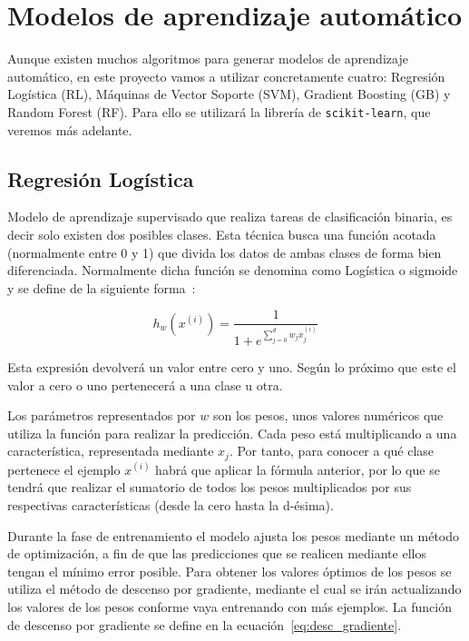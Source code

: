 \documentclass[a4paper, 12pt]{book}
\begin{document}
\section{Modelos de aprendizaje automático}
\label{sec:modelos_aautomatico}

Aunque existen muchos algoritmos para generar modelos de aprendizaje automático, en este proyecto vamos a utilizar concretamente cuatro: Regresión Logística (RL), Máquinas de Vector Soporte (SVM), Gradient Boosting (GB) y Random Forest (RF). Para ello se utilizará la librería de \texttt{scikit-learn}, que veremos más adelante.

\subsection{Regresión Logística}
\label{subsec:regresion_logistica}

Modelo de aprendizaje supervisado que realiza tareas de clasificación binaria, es decir solo existen dos posibles clases. Esta técnica busca una función acotada (normalmente entre 0 y 1) que divida los datos de ambas clases de forma bien diferenciada. Normalmente dicha función se denomina como Logística o sigmoide y se define de la siguiente forma~\cite{Watt2020}:

\begin{equation}
    h_w(x^{(i)}) = \frac{1}{1 + e^{\sum_{j=0}^{d} w_j x_j^{(i)} }}
\end{equation}

Esta expresión devolverá un valor entre cero y uno. Según lo próximo que este el valor a cero o uno pertenecerá a una clase u otra. 

Los parámetros representados por $w$ son los pesos, unos valores numéricos que utiliza la función para realizar la predicción. Cada peso está multiplicando a una característica, representada mediante $x_j$. Por tanto, para conocer a qué clase pertenece el ejemplo $x^{(i)}$ habrá que aplicar la fórmula anterior, por lo que se tendrá que realizar el sumatorio de todos los pesos multiplicados por sus respectivas características (desde la cero hasta la d-ésima). 

Durante la fase de entrenamiento el modelo ajusta los pesos mediante un método de optimización, a fin de que las predicciones que se realicen mediante ellos tengan el mínimo error posible. Para obtener los valores óptimos de los pesos se utiliza el método de descenso por gradiente, mediante el cual se irán actualizando los valores de los pesos conforme vaya entrenando con más ejemplos. La función de descenso por gradiente se define en la ecuación~\ref{eq:desc_gradiente}.
\end{document}
